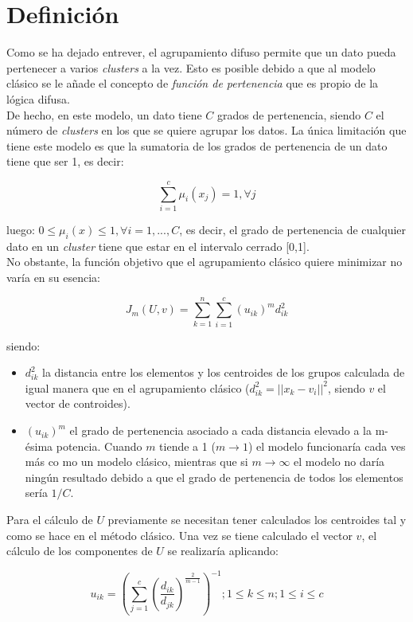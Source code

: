 \documentclass[]{report}
\begin{document}
		\section{Definición}
			Como se ha dejado entrever, el agrupamiento difuso permite que un dato pueda pertenecer a varios \textit{clusters} a la vez. Esto es posible debido a que al modelo clásico se le añade el concepto de \textit{función de pertenencia} que es propio de la lógica difusa.\\
			
			De hecho, en este modelo, un dato tiene $C$ grados de pertenencia, siendo $C$ el número de \textit{clusters} en los que se quiere agrupar los datos. La única limitación que tiene este modelo es que la sumatoria de los grados de pertenencia de un dato tiene que ser 1, es decir:
			
			$$\sum_{i=1}^c\mu_i(x_j) = 1, \forall j$$
			
			luego: $0 \leq \mu_i(x) \leq 1, \forall i=1,...,C$, es decir, el grado de pertenencia de cualquier dato en un \textit{cluster} tiene que estar en el intervalo cerrado [0,1].\\
			
			No obstante, la función objetivo que el agrupamiento clásico quiere minimizar no varía en su esencia:
			
			$$J_m(U,v) = \sum_{k=1}^n \sum_{i=1}^c (u_{ik})^m d^2_{ik}$$

			siendo:
			\begin{itemize}
				\item $d^2_{ik}$ la distancia entre los elementos y los centroides de los grupos calculada de igual manera que en el agrupamiento clásico ($d^2_{ik} = ||x_k-v_i||^2$, siendo $v$ el vector de controides).
				\item $(u_{ik})^m$ el grado de pertenencia asociado a cada distancia elevado a la m-ésima potencia. Cuando $m$ tiende a 1 ($m \rightarrow 1$) el modelo funcionaría cada ves más co mo un modelo clásico, mientras que si $m \rightarrow \infty$ el modelo no daría ningún resultado debido a que el grado de pertenencia de todos los elementos sería $1/C$.
			\end{itemize}
		
			Para el cálculo de $U$ previamente se necesitan tener calculados los centroides tal y como se hace en el método clásico. Una vez se tiene calculado el vector $v$, el cálculo de los componentes de $U$ se realizaría aplicando:
			
			$$u_{ik} = (\sum_{j=1}^c(\frac{d _{ik}}{d_{jk}})^{\frac{2}{m-1}})^{-1} ; 1 \leq k \leq n; 1\leq i \leq c $$
		
\end{document}
